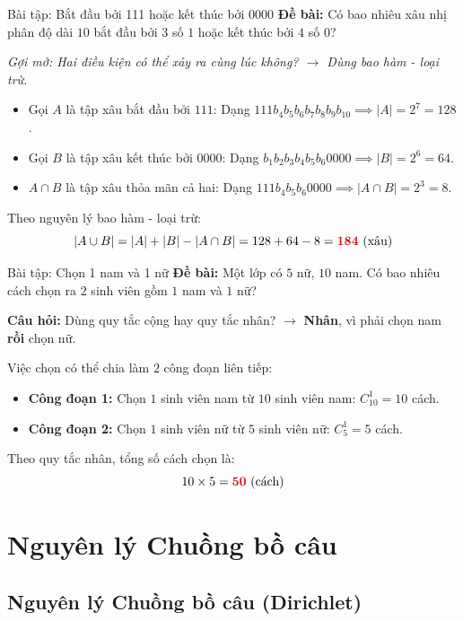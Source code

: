 \documentclass[12pt,a4paper]{article}
\begin{document}
\begin{baitap}{Bài tập: Bắt đầu bởi 111 hoặc kết thúc bởi 0000}
\textbf{Đề bài:} Có bao nhiêu xâu nhị phân độ dài $10$ bắt đầu bởi $3$ số $1$ hoặc kết thúc bởi $4$ số $0$?

\textit{Gợi mở: Hai điều kiện có thể xảy ra cùng lúc không? $\rightarrow$ Dùng bao hàm - loại trừ.}
\begin{itemize}
  \item Gọi $A$ là tập xâu bắt đầu bởi $111$: Dạng $111b_4 b_5 b_6 b_7 b_8 b_9 b_{10} \implies |A| = 2^7 = 128$.
  \item Gọi $B$ là tập xâu kết thúc bởi $0000$: Dạng $b_1 b_2 b_3 b_4 b_5 b_6 0000 \implies |B| = 2^6 = 64$.
  \item $A \cap B$ là tập xâu thỏa mãn cả hai: Dạng $111b_4 b_5 b_6 0000 \implies |A \cap B| = 2^3 = 8$.
\end{itemize}
Theo nguyên lý bao hàm - loại trừ:
\[
  |A \cup B| = |A| + |B| - |A \cap B| = 128 + 64 - 8 = \textcolor{AccentRed}{\mathbf{184}}\text{ (xâu)}
\]
\end{baitap}

\begin{baitap}{Bài tập: Chọn 1 nam và 1 nữ}
\textbf{Đề bài:} Một lớp có $5$ nữ, $10$ nam. Có bao nhiêu cách chọn ra $2$ sinh viên gồm $1$ nam và $1$ nữ?

\textbf{Câu hỏi:} Dùng quy tắc cộng hay quy tắc nhân? $\rightarrow$ \textbf{Nhân}, vì phải chọn nam \textbf{rồi} chọn nữ.

Việc chọn có thể chia làm $2$ công đoạn liên tiếp:
\begin{itemize}
  \item \textbf{Công đoạn 1:} Chọn $1$ sinh viên nam từ $10$ sinh viên nam: $C_{10}^1 = 10$ cách.
  \item \textbf{Công đoạn 2:} Chọn $1$ sinh viên nữ từ $5$ sinh viên nữ: $C_5^1 = 5$ cách.
\end{itemize}
Theo quy tắc nhân, tổng số cách chọn là:
\[
  10 \times 5 = \textcolor{AccentRed}{\mathbf{50}}\text{ (cách)}
\]
\end{baitap}

\section{Nguyên lý Chuồng bồ câu}

\subsection{Nguyên lý Chuồng bồ câu (Dirichlet)}
\end{document}
